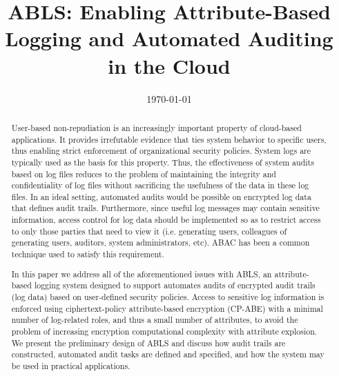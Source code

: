 \documentclass{sig-alternate}
\begin{document}
\title{ABLS: Enabling Attribute-Based Logging and Automated Auditing in the Cloud}
\author{
}
\date{\today}
\maketitle
\begin{abstract}
User-based non-repudiation is an increasingly important property of cloud-based applications. It provides irrefutable 
evidence that ties system behavior to specific users, thus enabling strict enforcement of organizational security policies. 
System logs are typically used as the basis for this property. Thus, the effectiveness of system audits based on log files 
reduces to the problem of maintaining the integrity and confidentiality of log files without sacrificing the usefulness
of the data in these log files. In an ideal setting, automated audits would be possible on encrypted log data that defines
audit trails. Furthermore, since useful log messages may contain sensitive information, access control for log 
data should be implemented so as to restrict access to only those parties that need to view it (i.e. generating users,
colleagues of generating users, auditors, system administrators, etc). ABAC has been a common technique used to
satisfy this requirement. %

In this paper we address all of the aforementioned issues with ABLS, an attribute-based logging system designed
to support automates audits of encrypted audit trails (log data) based on user-defined security policies. Access to
sensitive log information is enforced using ciphertext-policy attribute-based encryption (CP-ABE) with a minimal number
of log-related roles, and thus a small number of attributes, to avoid the problem of increasing encryption computational
complexity with attribute explosion. We present the preliminary design of ABLS and discuss how audit trails are 
constructed, automated audit tasks are defined and specified, and how the system may be used in practical applications.
\end{abstract}
\end{document}
